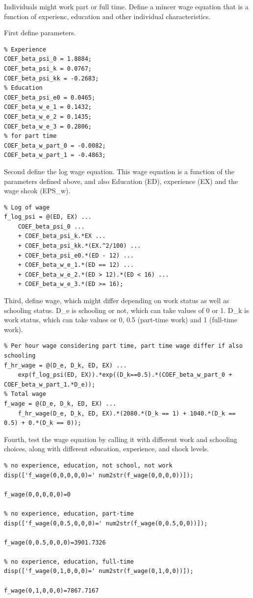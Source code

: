 \documentclass[
]{book}
\begin{document}
Individuals might work part or full time. Define a mincer wage equation
that is a function of experienc, education and other individual
characteristics.

First define parameters.

\begin{verbatim}
% Experience
COEF_beta_psi_0 = 1.8884;
COEF_beta_psi_k = 0.0767;
COEF_beta_psi_kk = -0.2683;
% Education
COEF_beta_psi_e0 = 0.0465;
COEF_beta_w_e_1 = 0.1432;
COEF_beta_w_e_2 = 0.1435;
COEF_beta_w_e_3 = 0.2806;
% for part time
COEF_beta_w_part_0 = -0.0082;
COEF_beta_w_part_1 = -0.4863;
\end{verbatim}

Second define the log wage equation. This wage equation is a function of
the parameters defined above, and also Education (ED), experience (EX)
and the wage shcok (EPS\_w).

\begin{verbatim}
% Log of wage
f_log_psi = @(ED, EX) ...
    COEF_beta_psi_0 ...
    + COEF_beta_psi_k.*EX ...
    + COEF_beta_psi_kk.*(EX.^2/100) ...
    + COEF_beta_psi_e0.*(ED - 12) ...
    + COEF_beta_w_e_1.*(ED == 12) ...
    + COEF_beta_w_e_2.*(ED > 12).*(ED < 16) ...
    + COEF_beta_w_e_3.*(ED >= 16);
\end{verbatim}

Third, define wage, which might differ depending on work status as well
as schooling status. D\_e is schooling or not, which can take values of 0
or 1. D\_k is work status, which can take values or 0, 0.5 (part-time
work) and 1 (full-time work).

\begin{verbatim}
% Per hour wage considering part time, part time wage differ if also schooling
f_hr_wage = @(D_e, D_k, ED, EX) ...
    exp(f_log_psi(ED, EX)).*exp((D_k==0.5).*(COEF_beta_w_part_0 + COEF_beta_w_part_1.*D_e));
% Total wage
f_wage = @(D_e, D_k, ED, EX) ...
    f_hr_wage(D_e, D_k, ED, EX).*(2080.*(D_k == 1) + 1040.*(D_k == 0.5) + 0.*(D_k == 0));
\end{verbatim}

Fourth, test the wage equation by calling it with different work and
schooling choices, along with different education, experience, and shock
levels.

\begin{verbatim}
% no experience, education, not school, not work
disp(['f_wage(0,0,0,0,0)=' num2str(f_wage(0,0,0,0))]);

f_wage(0,0,0,0,0)=0

% no experience, education, part-time
disp(['f_wage(0,0.5,0,0,0)=' num2str(f_wage(0,0.5,0,0))]);

f_wage(0,0.5,0,0,0)=3901.7326

% no experience, education, full-time
disp(['f_wage(0,1,0,0,0)=' num2str(f_wage(0,1,0,0))]);

f_wage(0,1,0,0,0)=7867.7167
\end{verbatim}
\end{document}
